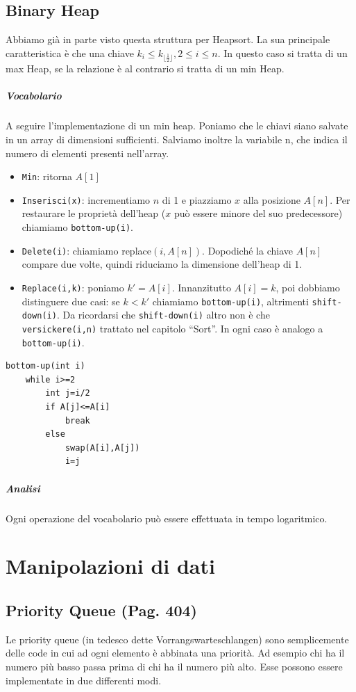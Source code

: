 \documentclass[a4paper]{book}
\newcommand{\inline}[1]{\lstinline!#1!}%
\newcommand{\lstIndent}{4}
\begin{document}
\section{Binary Heap}
Abbiamo già in parte visto questa struttura per Heapsort. La sua principale caratteristica è che una chiave $k_i \leq k_{\lfloor\frac{1}{2} \rfloor}, 2\leq i\leq n$. In questo caso si tratta di un max Heap, se la relazione è al contrario si tratta di un min Heap. 
\paragraph*{Vocabolario}
A seguire l'implementazione di un min heap. Poniamo che le chiavi siano salvate in un array di dimensioni sufficienti. Salviamo inoltre la variabile n, che indica il numero di elementi presenti nell'array.
\begin{itemize}
\item \inline{Min}: ritorna $A[1]$
\item \inline{Inserisci(x)}: incrementiamo $n$ di 1 e piazziamo $x$ alla posizione $A[n]$. Per restaurare le proprietà dell'heap ($x$ può essere minore del suo predecessore) chiamiamo \inline{bottom-up(i)}.
\item \inline{Delete(i)}: chiamiamo replace$(i,A[n])$. Dopodiché la chiave $A[n]$ compare due volte, quindi riduciamo la dimensione dell'heap di 1. 
\item \inline{Replace(i,k)}: poniamo $k'=A[i]$. Innanzitutto $A[i]=k$, poi dobbiamo distinguere due casi: se $k<k'$ chiamiamo \inline{bottom-up(i)}, altrimenti \inline{shift-down(i)}. Da ricordarsi che \inline{shift-down(i)} altro non è che \\\inline{versickere(i,n)} trattato nel capitolo ``Sort''. In ogni caso è analogo a \inline{bottom-up(i)}.
\end{itemize}
\begin{lstlisting}[tabsize=\lstIndent]
bottom-up(int i)
	while i>=2
		int j=i/2
		if A[j]<=A[i]
			break
		else
			swap(A[i],A[j])
			i=j	
\end{lstlisting}
\paragraph*{Analisi}
Ogni operazione del vocabolario può essere effettuata in tempo logaritmico.
\chapter{Manipolazioni di dati}
\section{Priority Queue (Pag. 404)}
Le priority queue (in tedesco dette Vorrangswarteschlangen) sono semplicemente delle code in cui ad ogni elemento è abbinata una priorità. Ad esempio chi ha il numero più basso passa prima di chi ha il numero più alto. Esse possono essere implementate in due differenti modi.
\end{document}
